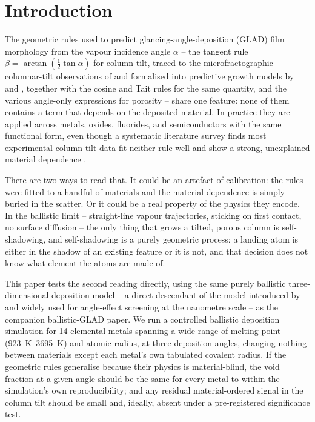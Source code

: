 \documentclass[aip,jcp,amsmath,amssymb,reprint]{revtex4-1}
\begin{document}
\maketitle

\section{Introduction}
\label{sec:intro}

The geometric rules used to predict glancing-angle-deposition (GLAD) film
morphology from the vapour incidence angle $\alpha$ -- the tangent rule
$\beta = \arctan(\tfrac{1}{2}\tan\alpha)$ for column tilt, traced to the
microfractographic columnar-tilt observations of \citet{nieuwenhuizen1966}
and formalised into predictive growth models by \citet{tait1993modelling}
and \citet{lichter1986model}, together with the cosine and Tait rules for
the same quantity, and the various angle-only expressions for porosity --
share one feature: none of them contains a term that depends on the
deposited material. In practice they are applied across metals, oxides,
fluorides, and semiconductors with the same functional form, even though a
systematic literature survey finds most experimental column-tilt data fit
neither rule well and show a strong, unexplained material dependence
\citep{zhu2012tilting}.

There are two ways to read that. It could be an artefact of calibration: the
rules were fitted to a handful of materials and the material dependence is simply
buried in the scatter. Or it could be a real property of the physics they
encode. In the ballistic limit -- straight-line vapour trajectories, sticking on
first contact, no surface diffusion -- the only thing that grows a tilted, porous
column is self-shadowing, and self-shadowing is a purely geometric process: a
landing atom is either in the shadow of an existing feature or it is not, and
that decision does not know what element the atoms are made of.

This paper tests the second reading directly, using the same purely
ballistic three-dimensional deposition model -- a direct descendant of the
model introduced by \citet{smy2000films} and widely used for angle-effect
screening at the nanometre scale \citep{karabacak2003} -- as the companion
ballistic-GLAD paper. We run a controlled ballistic deposition simulation
for \num{14} elemental metals spanning a wide range of melting point
(\SIrange{923}{3695}{K}) and atomic radius, at three deposition angles,
changing nothing between materials except each metal's own tabulated
covalent radius. If the geometric rules generalise because their physics is
material-blind, the void fraction at a given angle should be the same for every
metal to within the simulation's own reproducibility; and any residual
material-ordered signal in the column tilt should be small and, ideally, absent
under a pre-registered significance test.
\end{document}
